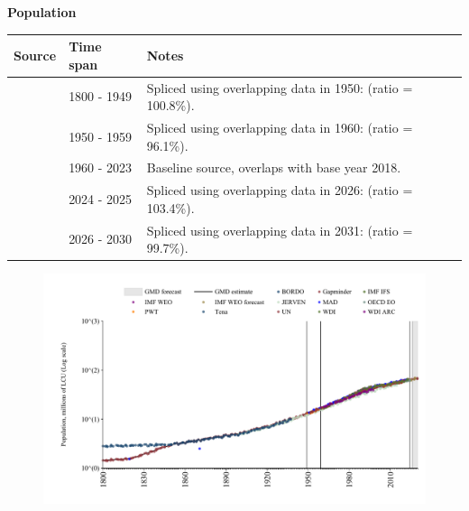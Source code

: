 \documentclass[12pt,a4paper,landscape]{article}
\begin{document}
\begin{adjustbox}{max totalsize={\paperwidth}{\paperheight},center}
\begin{minipage}[t][\textheight][t]{\textwidth}
\vspace*{0.5cm}
{}
\begin{center}
{\Large\bfseries Population}
\end{center}
\vspace{0.5cm}
\begin{table}[H]
\centering
\small
\begin{tabular}{|l|l|l|}
\hline
\textbf{Source} & \textbf{Time span} & \textbf{Notes} \\
\hline
\rowcolor{white}\cite{Gapminder}& 1800 - 1949 &Spliced using overlapping data in 1950: (ratio = 100.8\%). \\
\rowcolor{lightgray}\cite{IMF_IFS}& 1950 - 1959 &Spliced using overlapping data in 1960: (ratio = 96.1\%). \\
\rowcolor{white}\cite{WDI}& 1960 - 2023 &Baseline source, overlaps with base year 2018. \\
\rowcolor{lightgray}\cite{OECD_EO}& 2024 - 2025 &Spliced using overlapping data in 2026: (ratio = 103.4\%). \\
\rowcolor{white}\cite{Gapminder}& 2026 - 2030 &Spliced using overlapping data in 2031: (ratio = 99.7\%). \\
\hline
\end{tabular}
\end{table}
\begin{figure}[H]
\centering
\includegraphics[width=\textwidth,height=0.6\textheight,keepaspectratio]{graphs/ZAF_pop.pdf}
\end{figure}
\end{minipage}
\end{adjustbox}
\end{document}
